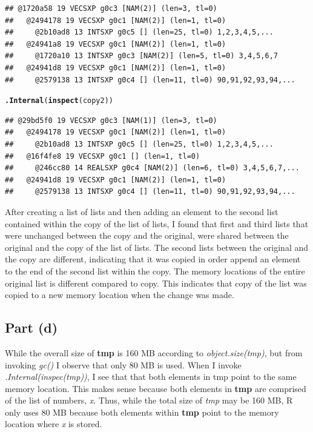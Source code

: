 \documentclass{article}\usepackage[]{graphicx}\usepackage[]{color}
\makeatletter
\newcommand{\hlstd}[1]{\textcolor[rgb]{0.345,0.345,0.345}{#1}}%
\newcommand{\hlkwd}[1]{\textcolor[rgb]{0.737,0.353,0.396}{\textbf{#1}}}%
\newenvironment{kframe}{%
 \def\at@end@of@kframe{}%
 \ifinner\ifhmode%
  \def\at@end@of@kframe{\end{minipage}}%
  \begin{minipage}{\columnwidth}%
 \fi\fi%
 \def\FrameCommand##1{\hskip\@totalleftmargin \hskip-\fboxsep
 \colorbox{shadecolor}{##1}\hskip-\fboxsep
     \hskip-\linewidth \hskip-\@totalleftmargin \hskip\columnwidth}%
 \MakeFramed {\advance\hsize-\width
   \@totalleftmargin\z@ \linewidth\hsize
   \@setminipage}}%
 {\par\unskip\endMakeFramed%
 \at@end@of@kframe}
\newenvironment{knitrout}{}{} %
\makeatother
\begin{document}
\begin{knitrout}
\begin{kframe}
\begin{verbatim}
## @1720a58 19 VECSXP g0c3 [NAM(2)] (len=3, tl=0)
##   @2494178 19 VECSXP g0c1 [NAM(2)] (len=1, tl=0)
##     @2b10ad8 13 INTSXP g0c5 [] (len=25, tl=0) 1,2,3,4,5,...
##   @24941a8 19 VECSXP g0c1 [NAM(2)] (len=1, tl=0)
##     @1720a10 13 INTSXP g0c3 [NAM(2)] (len=5, tl=0) 3,4,5,6,7
##   @24941d8 19 VECSXP g0c1 [NAM(2)] (len=1, tl=0)
##     @2579138 13 INTSXP g0c4 [] (len=11, tl=0) 90,91,92,93,94,...
\end{verbatim}
\begin{alltt}
\hlkwd{.Internal}\hlstd{(}\hlkwd{inspect}\hlstd{(copy2))}
\end{alltt}
\begin{verbatim}
## @29bd5f0 19 VECSXP g0c3 [NAM(1)] (len=3, tl=0)
##   @2494178 19 VECSXP g0c1 [NAM(2)] (len=1, tl=0)
##     @2b10ad8 13 INTSXP g0c5 [] (len=25, tl=0) 1,2,3,4,5,...
##   @16f4fe8 19 VECSXP g0c1 [] (len=1, tl=0)
##     @246cc80 14 REALSXP g0c4 [NAM(2)] (len=6, tl=0) 3,4,5,6,7,...
##   @24941d8 19 VECSXP g0c1 [NAM(2)] (len=1, tl=0)
##     @2579138 13 INTSXP g0c4 [] (len=11, tl=0) 90,91,92,93,94,...
\end{verbatim}
\end{kframe}
\end{knitrout}
After creating a list of lists and then adding an element to the second list contained within the copy of the list of lists, I found that first and third lists that were unchanged between the copy and the original, were shared between the original and the copy of the list of lists.  The second lists between the original and the copy are different, indicating that it was copied in order append an element to the end of the second list within the copy.  The memory locations of the entire original list is different compared to copy.  This indicates that copy of the list was copied to a new memory location when the change was made.
\subsection{Part (d)}
While the overall size of \textbf{tmp} is 160 MB according to \emph{object.size(tmp)}, but from invoking \emph{gc()} I observe that only 80 MB is used.  When I invoke \emph{.Internal(inspec(tmp))}, I see that that both elements in tmp point to the same memory location.  This makes sense because both elements in \textbf{tmp} are comprised of the list of numbers, \emph{x}.  Thus, while the total size of \emph{tmp} may be 160 MB, R only uses 80 MB because both elements within \textbf{tmp} point to the memory location where \emph{x} is stored.
\end{document}
